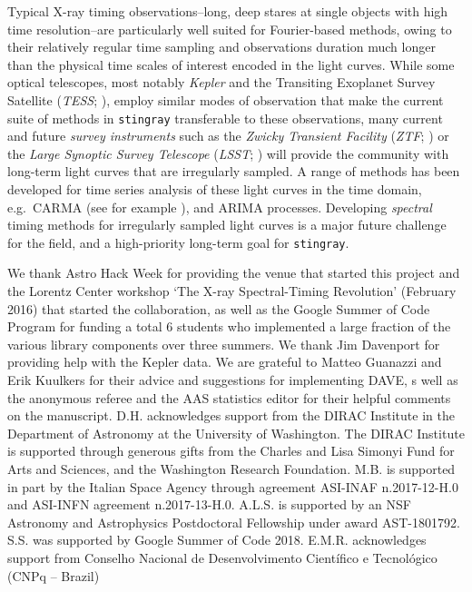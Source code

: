 \documentclass[twocolumn]{aastex62}
\newcommand{\stingray}{\texttt{stingray}\xspace}
\begin{document}
Typical X-ray timing observations--long, deep stares at single objects with high time resolution--are particularly well suited for Fourier-based methods, owing to their relatively regular time sampling and observations duration much longer than the physical time scales of interest encoded in the light curves. While some optical telescopes, most notably \textit{Kepler} and the Transiting Exoplanet Survey Satellite (\textit{TESS}; \citealt{ricker2015}), employ similar modes of observation that make the current suite of methods in \stingray transferable to these observations, many current and future \textit{survey instruments} such as the \textit{Zwicky Transient Facility} (\textit{ZTF}; \citealt{bellm2019,graham2019}) or the \textit{Large Synoptic Survey Telescope} (\textit{LSST}; \citealt{lsst2019}) will provide the community with long-term light curves that are irregularly sampled. A range of methods has been developed for time series analysis of these light curves in the time domain, e.g.\ CARMA (see for example \citealt{kelly2014,foremanmackey2017}), and ARIMA \citep[e.g.][]{feigelson2018} processes. Developing \textit{spectral} timing methods for irregularly sampled light curves is a major future challenge for the field, and a high-priority long-term goal for \stingray.


\acknowledgments

We thank Astro Hack Week for providing the venue that started this project and the Lorentz Center workshop `The X-ray Spectral-Timing Revolution' (February 2016) that started the collaboration, as well as the Google Summer of Code Program for funding a total 6 students who implemented a large fraction of the various library components over three summers. We thank Jim Davenport for providing help with the Kepler data. We are grateful to Matteo Guanazzi and Erik Kuulkers for their advice and suggestions for implementing DAVE, s well as the anonymous referee and the AAS statistics editor for their helpful comments on the manuscript.
D.H. acknowledges support from the DIRAC Institute in the Department of Astronomy at the University of Washington. 
The DIRAC Institute is supported through generous gifts from the Charles and Lisa Simonyi Fund for Arts and Sciences, and the Washington Research Foundation.
M.B. is supported in part by the Italian Space Agency through agreement ASI-INAF n.2017-12-H.0 and ASI-INFN agreement n.2017-13-H.0.
A.L.S. is supported by an NSF Astronomy and Astrophysics Postdoctoral Fellowship under award AST-1801792.
S.S. was supported by Google Summer of Code 2018.
E.M.R. acknowledges support from Conselho Nacional de Desenvolvimento Cient\'ifico e Tecnol\'ogico (CNPq -- Brazil)
\end{document}
